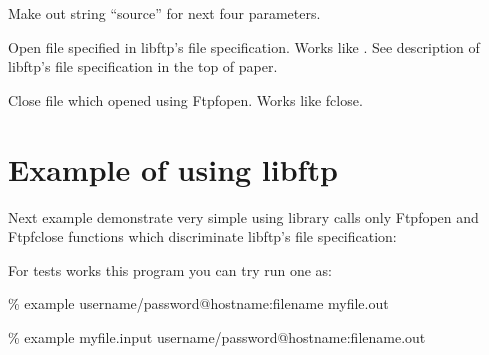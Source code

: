 {Make out string ``source'' for next four parameters.}

{
	Open file specified in libftp's file specification. Works like 
	. See description of libftp's file specification in the 
	top of paper.
}

{
	Close file which opened using Ftpfopen. Works like fclose.
}



\section{Example of using libftp}

Next example demonstrate very simple using library calls only Ftpfopen 
and Ftpfclose functions which discriminate libftp's file specification:



For tests works this program you can try run one as:

\bigskip

\% example username/password@hostname:filename myfile.out

\% example myfile.input username/password@hostname:filename.out


\newpage

\newpage
\tableofcontents













